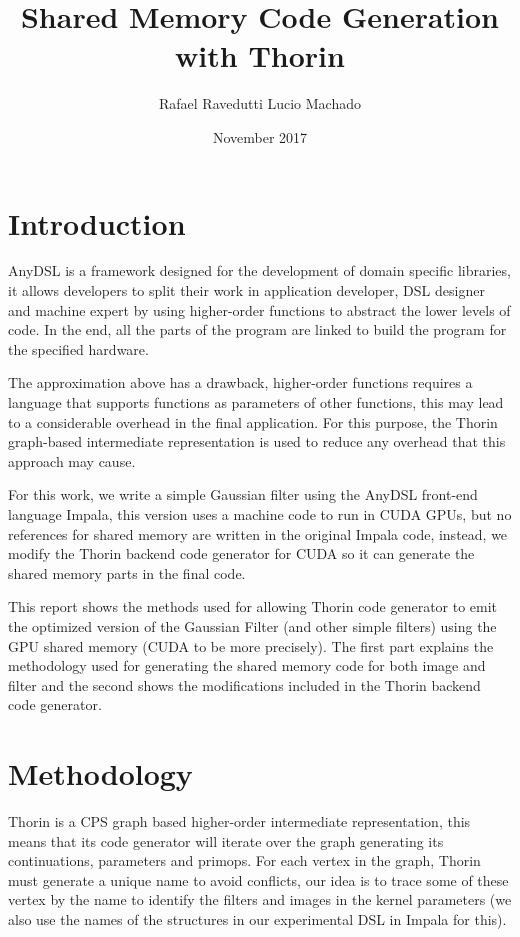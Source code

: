\documentclass{article}
\title{Shared Memory Code Generation with Thorin}
\author{Rafael Ravedutti Lucio Machado }
\date{November 2017}
\begin{document}
\maketitle

\clearpage

\tableofcontents

\clearpage

\section{Introduction}
AnyDSL is a framework designed for the development of domain specific libraries, it allows developers to split their work in application developer, DSL designer and machine expert by using higher-order functions to abstract the lower levels of code. In the end, all the parts of the program are linked to build the program for the specified hardware.

The approximation above has a drawback, higher-order functions requires a language that supports functions as parameters of other functions, this may lead to a considerable overhead in the final application. For this purpose, the Thorin graph-based intermediate representation is used to reduce any overhead that this approach may cause.

For this work, we write a simple Gaussian filter using the AnyDSL front-end language Impala, this version uses a machine code to run in CUDA GPUs, but no references for shared memory are written in the original Impala code, instead, we modify the Thorin backend code generator for CUDA so it can generate the shared memory parts in the final code.

This report shows the methods used for allowing Thorin code generator to emit the optimized version of the Gaussian Filter (and other simple filters) using the GPU shared memory (CUDA to be more precisely). The first part explains the methodology used for generating the shared memory code for both image and filter and the second shows the modifications included in the Thorin backend code generator.

\section{Methodology}
Thorin is a CPS graph based higher-order intermediate representation, this means that its code generator will iterate over the graph generating its continuations, parameters and primops. For each vertex in the graph, Thorin must generate a unique name to avoid conflicts, our idea is to trace some of these vertex by the name to identify the filters and images in the kernel parameters (we also use the names of the structures in our experimental DSL in Impala for this).
\end{document}
